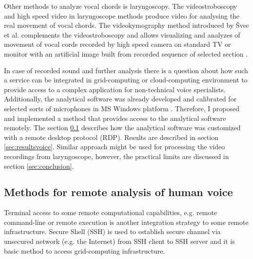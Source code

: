 Other methods to analyze vocal chords is laryngoscopy. The videostroboscopy and high speed video in laryngoscope methods produce video for analysing the real movement of vocal chords. The videokymography method introduced by Švec et al. complements the videostroboscopy and allows visualizing and analyzes of movement of vocal cords recorded by high speed camera on standard TV or monitor with an artificial image built from recorded sequence of selected section \cite{Svec1996,Svec2007}. 

In case of recorded sound and further analysis there is a question about how such a service can be integrated in grid-computing or cloud-computing environment to provide access to a complex application for non-technical voice specialists. Additionally, the analytical software was already developed and calibrated for selected sorts of microphones in MS Windows platform \cite{Fric2007,Fric2012}. Therefore, I proposed and implemented a method that provides access to the analytical software remotely. The section \ref{sec:methodsvoice} describes how the analytical software was customized with a remote desktop protocol (RDP). Results are described in section \ref{sec:resultsvoice}. Similar approach might be used for processing the video recordings from laryngoscope, however, the practical limits are discussed in section \ref{sec:conclusion}. 

\subsection{Methods for remote analysis of human voice}
\label{sec:methodsvoice}
Terminal access to some remote computational capabilities, e.g. remote command-line or remote execution is another integration strategy to some remote infrastructure. Secure Shell (SSH) is used to establish secure channel via unsecured network (e.g. the Internet) from SSH client to SSH server and it is basic method to access grid-computing infrastructure. 

